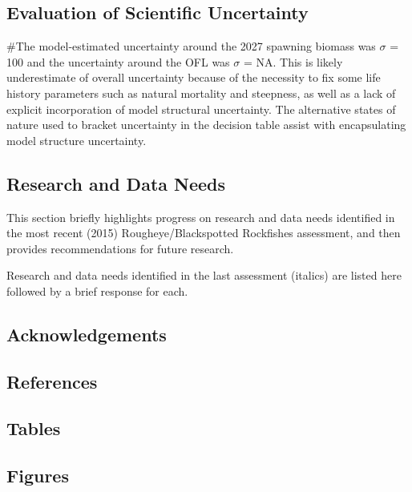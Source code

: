 \documentclass[
]{scrartcl}
\begin{document}
\subsection{Evaluation of Scientific
Uncertainty}\label{evaluation-of-scientific-uncertainty-1}

\#The model-estimated uncertainty around the 2027 spawning biomass was
\(\sigma\) = 100 and the uncertainty around the OFL was \(\sigma\) = NA.
This is likely underestimate of overall uncertainty because of the
necessity to fix some life history parameters such as natural mortality
and steepness, as well as a lack of explicit incorporation of model
structural uncertainty. The alternative states of nature used to bracket
uncertainty in the decision table assist with encapsulating model
structure uncertainty.

\subsection{Research and Data Needs}\label{research-and-data-needs-1}

This section briefly highlights progress on research and data needs
identified in the most recent (2015) Rougheye/Blackspotted Rockfishes
assessment, and then provides recommendations for future research.

Research and data needs identified in the last assessment (italics) are
listed here followed by a brief response for each.

\newpage{}

\subsection{Acknowledgements}\label{sec-acknowledgements}

\newpage{}

\subsection{References}\label{references}

\newpage{}

\subsection{Tables}\label{tables}

\newpage{}

\subsection{Figures}\label{figures}
\end{document}
